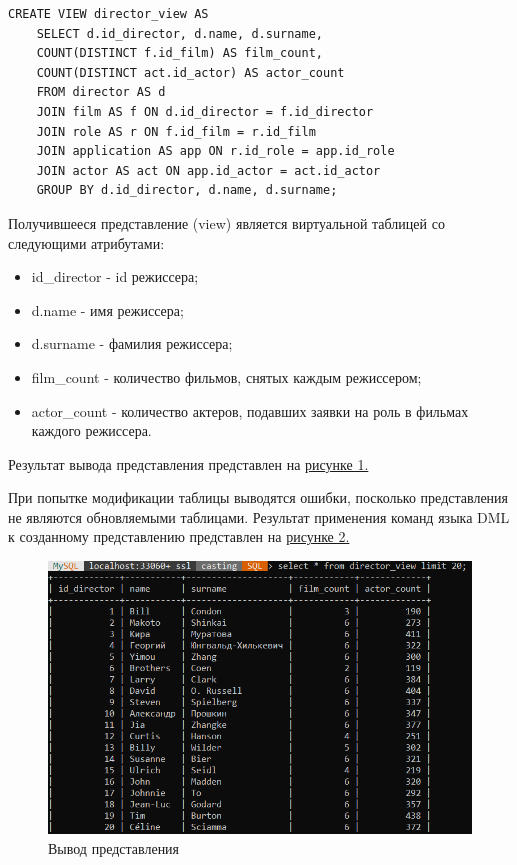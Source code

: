 \documentclass[11pt,a4paper,final]{article} %
\begin{document}
\begin{lstlisting}[caption={Создание представления}, label=lst:l1]
CREATE VIEW director_view AS
	SELECT d.id_director, d.name, d.surname, 
	COUNT(DISTINCT f.id_film) AS film_count, 
	COUNT(DISTINCT act.id_actor) AS actor_count
	FROM director AS d
	JOIN film AS f ON d.id_director = f.id_director
	JOIN role AS r ON f.id_film = r.id_film
	JOIN application AS app ON r.id_role = app.id_role
	JOIN actor AS act ON app.id_actor = act.id_actor
	GROUP BY d.id_director, d.name, d.surname;
\end{lstlisting}

Получившееся представление (view) является виртуальной таблицей со следующими атрибутами:
\begin{itemize}
	\item id\_director - id режиссера;
	\item d.name - имя режиссера;
	\item d.surname - фамилия режиссера;
	\item film\_count - количество фильмов, снятых каждым режиссером;
	\item actor\_count - количество актеров, подавших заявки на роль в фильмах каждого режиссера.
\end{itemize}

Результат вывода представления представлен на \hyperref[fig:pic1]{рисунке 1.}

При попытке модификации таблицы выводятся ошибки, посколько представления не являются обновляемыми таблицами. 
Результат применения команд языка DML к созданному представлению представлен на \hyperref[fig:pic2]{рисунке 2.}

\newpage
\begin{figure}[H]
	\centering
	\includegraphics[width=0.8\linewidth]{pic1.png}
	\caption{Вывод представления}
	\label{fig:pic1}
\end{figure}
\end{document}
